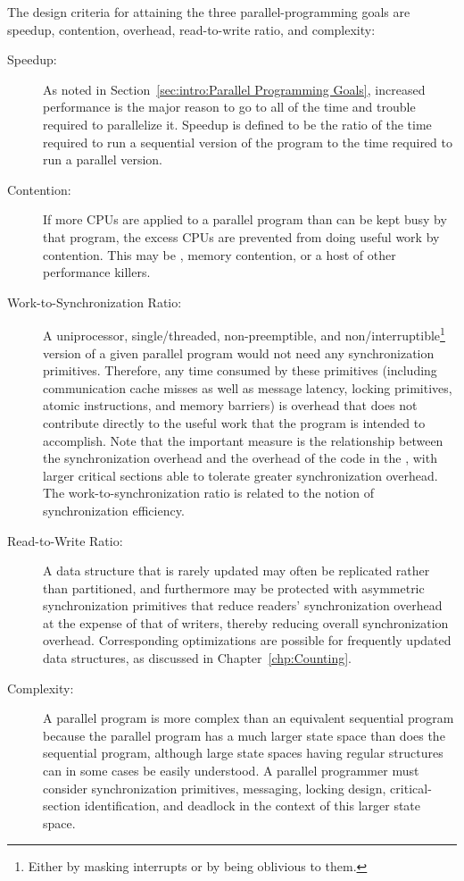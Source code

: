 The design criteria for attaining the three parallel-programming goals
are speedup,
contention, overhead, read-to-write ratio, and complexity:
\begin{description}
\item[Speedup:]  As noted in
	Section~\ref{sec:intro:Parallel Programming Goals},
	increased performance is the major reason
	to go to all of the time and trouble
	required to parallelize it.
	Speedup is defined to be the ratio of the time required
	to run a sequential version of the program to the time
	required to run a parallel version.
\item[Contention:]  If more CPUs are applied to a parallel
	program than can be kept busy by that program,
	the excess CPUs are prevented from doing
	useful work by contention.
	This may be , memory contention, or a host
	of other performance killers.
\item[Work-to-Synchronization Ratio:]  A uniprocessor,
	single\-/threaded, non-preemptible, and non\-/interruptible\footnote{
		Either by masking interrupts or by being oblivious to them.}
	version of a given parallel
	program would not need any synchronization primitives.
	Therefore, any time consumed by these primitives
	(including communication cache misses as well as
	message latency, locking primitives, atomic instructions,
	and memory barriers)
	is overhead that does not contribute directly to the useful
	work that the program is intended to accomplish.
	Note that the important measure is the
	relationship between the synchronization overhead
	and the overhead of the code in the , with larger
	critical sections able to tolerate greater synchronization overhead.
	The work-to-synchronization ratio is related to
	the notion of synchronization efficiency.
\item[Read-to-Write Ratio:]  A data structure that is
	rarely updated may often be replicated rather than partitioned,
	and furthermore may be protected with asymmetric
	synchronization primitives that reduce readers' synchronization
	overhead at the expense of that of writers, thereby
	reducing overall synchronization overhead.
	Corresponding optimizations are possible for frequently
	updated data structures, as discussed in
	Chapter~\ref{chp:Counting}.
\item[Complexity:]  A parallel program is more complex than
	an equivalent sequential program because the parallel program
	has a much larger state space than does the sequential program,
	although large state spaces having regular structures can in
	some cases be easily understood.
	A parallel programmer must
	consider synchronization primitives, messaging, locking design,
	critical-section identification,
	and deadlock in the context of this larger state space.


\end{description}
